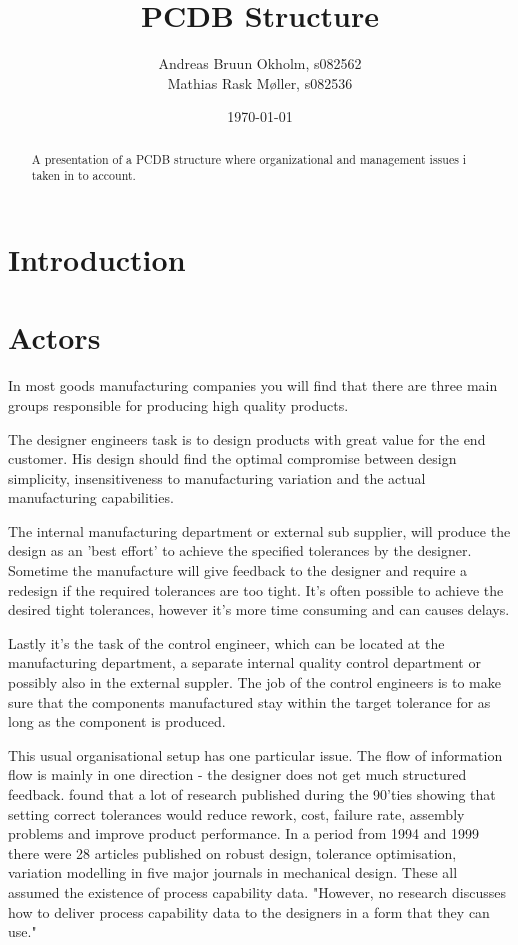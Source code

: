 \documentclass[aip,amsmath,reprint, author-year]{revtex4-1}
\begin{document}
\begin{abstract}
A presentation of a PCDB structure where organizational and management issues i taken in to account.
\end{abstract}

\title{PCDB Structure}
\author{Andreas Bruun Okholm, s082562\\
Mathias Rask Møller, s082536 }  
 
\date{\today}
\maketitle


\section{Introduction}

\section{Actors}
In most goods manufacturing companies you will find that there are three main groups responsible for producing high quality products.

The designer engineers task is to design products with great value for the end customer. 
His design should find the optimal compromise between design simplicity, insensitiveness to manufacturing variation and the actual manufacturing capabilities. 

The internal manufacturing department or external sub supplier, will produce the design as an 'best effort' to achieve the specified tolerances by the designer. Sometime the manufacture will give feedback to the designer and require a redesign if the required tolerances are too tight. It's often possible to achieve the desired tight tolerances, however it's more time consuming and can causes delays.

Lastly it's the task of the control engineer, which can be located at the manufacturing department, a separate internal quality control department or possibly also in the external suppler. 
The job of the control engineers is to make sure that the components manufactured stay within the target tolerance for as long as the component is produced.

This usual organisational setup has one particular issue. 
The flow of information flow is mainly in one direction - the designer does not get much structured feedback. \citet{tata1999process} found that a lot of research published during the 90'ties showing that setting correct tolerances would reduce rework, cost, failure rate, assembly problems and improve product performance. 
In a period from 1994 and 1999 there were 28 articles published on robust design, tolerance optimisation, variation modelling in five major journals in mechanical design. 
These all assumed the existence of process capability data. 
"However, no research discusses how to deliver process capability data to the designers in a form that they can use." \cite{tata1999process}
\end{document}
